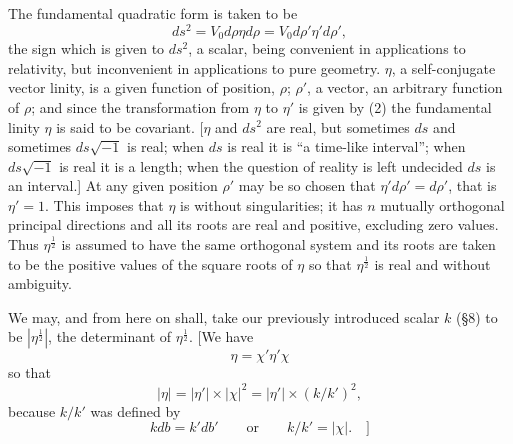 \documentclass[11pt]{article}
\begin{document}
\indent The fundamental quadratic form is taken to be
\begin{equation}ds^2=V_0d\rho\eta d\rho=V_0d\rho'\eta'd\rho',\tag{2}\end{equation}
the sign which is given to $ds^2$, a scalar, being convenient in applications to relativity, but inconvenient in applications to pure geometry. $\eta$, a self-conjugate vector linity, is a given function of position, $\rho$; $\rho'$, a vector, an arbitrary function of $\rho$; and since the transformation from $\eta$ to $\eta'$ is given by (2) the fundamental linity $\eta$ is said to be covariant. [$\eta$ and $ds^2$ are real, but sometimes $ds$ and sometimes $ds\sqrt{-1}$ is real; when $ds$ is real it is ``a time-like interval''; when $ds\sqrt{-1}$ is real it is a length; when the question of reality is left undecided $ds$ is an interval.] At any given position $\rho'$ may be so chosen that $\eta'd\rho'=d\rho'$, that is $\eta'=1$. This imposes that $\eta$ is without singularities; it has $n$ mutually orthogonal principal directions and all its roots are real and positive, excluding zero values. Thus $\eta^{\frac12}$ is assumed to have the same orthogonal system and its roots are taken to be the positive values of the square roots of $\eta$ so that $\eta^{\frac12}$ is real and without ambiguity.

\indent We may, and from here on shall, take our previously introduced scalar $k$ (§8) to be $|\eta^{\frac12}|$, the determinant of $\eta^{\frac12}$. [We have
\[
\eta=\chi'\eta'\chi
\]
so that
\[
|\eta|=|\eta'|\times|\chi|^2=|\eta'|\times(k/k')^2,
\]
because $k/k'$ was defined by
\[
kdb=k'db'\qquad\text{or}\qquad k/k'=|\chi|.\quad\text{]}
\]
\end{document}

